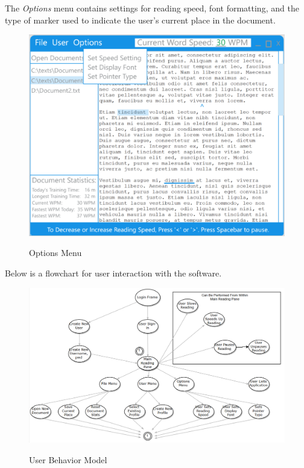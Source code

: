 \documentclass{article}
\begin{document}
{	\clearpage

	The \textit{Options} menu contains settings for reading speed, font formatting, and the type of marker used to indicate the user's current place in the document.\\

	\begin{figure}[!htb]
		\centering
		\includegraphics[scale=.7]{OptionsMenu.png}
		\label{fig:fig6}
		\caption{Options Menu}
	\end{figure}

	\clearpage

	Below is a flowchart for user interaction with the software.\\

	\begin{figure}[!htb]
		\centering
		\includegraphics[scale=.5]{UserBehaviorModel.png}
		\label{fig:fig7}
		\caption{User Behavior Model}
	\end{figure}
}
\end{document}
